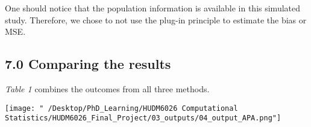\documentclass[
]{article}
\begin{document}
One should notice that the population information is available in this
simulated study. Therefore, we chose to not use the plug-in principle to
estimate the bias or MSE.

\hypertarget{comparing-the-results}{%
\subsection{7.0 Comparing the results}\label{comparing-the-results}}

\emph{Table 1} combines the outcomes from all three methods.

\texttt{[image: "~/Desktop/PhD\_Learning/HUDM6026 Computational Statistics/HUDM6026\_Final\_Project/03\_outputs/04\_output\_APA.png"]}
\end{document}
